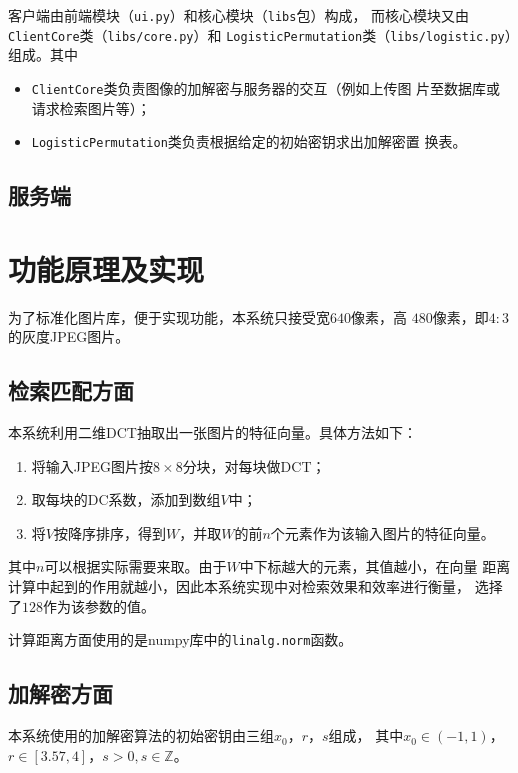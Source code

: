 
客户端由前端模块（\texttt{ui.py}）和核心模块（\texttt{libs}包）构成，
而核心模块又由\texttt{ClientCore}类（\texttt{libs/core.py}）和
\texttt{LogisticPermutation}类（\texttt{libs/logistic.py}）组成。其中
\begin{itemize}
\item \texttt{ClientCore}类负责图像的加解密与服务器的交互（例如上传图
  片至数据库或请求检索图片等）；
\item \texttt{LogisticPermutation}类负责根据给定的初始密钥求出加解密置
  换表。
\end{itemize}

\subsection{服务端}

\section{功能原理及实现}
\label{sec:func-impl}

为了标准化图片库，便于实现功能，本系统只接受宽$640$像素，高
$480$像素，即$4:3$的灰度JPEG图片。

\subsection{检索匹配方面}
\label{sec:retrieval-impl}
本系统利用二维DCT抽取出一张图片的特征向量。具体方法如下：
\begin{enumerate}
\item 将输入JPEG图片按$8 \times 8$分块，对每块做DCT；
\item 取每块的DC系数，添加到数组$V$中；
\item 将$V$按降序排序，得到$W$，并取$W$的前$n$个元素作为该输入图片的特征向量。
\end{enumerate}

其中$n$可以根据实际需要来取。由于$W$中下标越大的元素，其值越小，在向量
距离计算中起到的作用就越小，因此本系统实现中对检索效果和效率进行衡量，
选择了$128$作为该参数的值。

计算距离方面使用的是numpy库中的\texttt{linalg.norm}函数。

\subsection{加解密方面}
\label{sec:enc-dec-impl}

本系统使用的加解密算法的初始密钥由三组$x_0$，$r$，$s$组成，
其中$x_0 \in (-1, 1)$，$r \in [3.57, 4]$，$s > 0, s \in \mathbb{Z}$。

